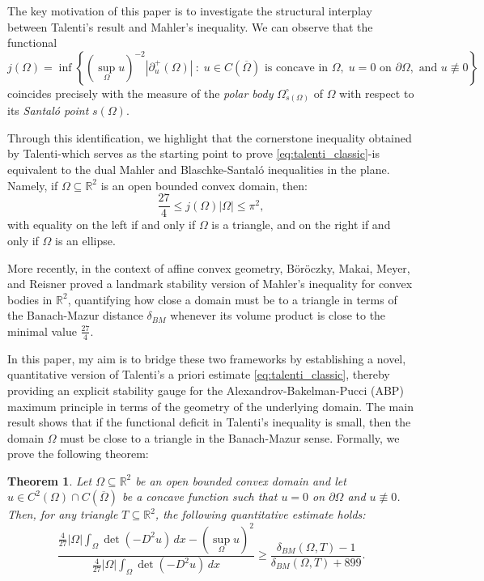 \documentclass[10pt,a4paper]{amsart}
\newtheorem{theorem}{Theorem}[section]
\numberwithin{equation}{section}
\begin{document}
\noindent The key motivation of this paper is to investigate the structural interplay between Talenti's result and Mahler's inequality. We can observe that the functional
\begin{equation}\label{eq:functional_j}
j(\Omega) = \inf \left\{ (\sup_\Omega u)^{-2} |\partial^+_u(\Omega)| \ : \; u \in C(\overline{\Omega}) \text{ is concave in } \Omega, \; u = 0 \text{ on } \partial \Omega, \text{ and } u \not\equiv 0 \right\}
\end{equation}
coincides precisely with the measure of the \textit{polar body} $\Omega^\circ_{s(\Omega)}$ of $\Omega$ with respect to its \textit{Santaló point} $s(\Omega)$. 

\noindent Through this identification, we highlight that the cornerstone inequality obtained by Talenti-which serves as the starting point to prove \eqref{eq:talenti_classic}-is equivalent to the dual Mahler and Blaschke-Santaló inequalities in the plane. Namely, if $\Omega \subseteq \mathbb{R}^2$ is an open bounded convex domain, then:
\begin{equation}
\frac{27}{4} \leq j(\Omega)|\Omega| \leq \pi^2,
\end{equation}
with equality on the left if and only if $\Omega$ is a triangle, and on the right if and only if $\Omega$ is an ellipse.

\noindent More recently, in the context of affine convex geometry, Böröczky, Makai, Meyer, and Reisner \cite{boroczky2013} proved a landmark stability version of Mahler's inequality for convex bodies in $\mathbb{R}^2$, quantifying how close a domain must be to a triangle in terms of the Banach-Mazur distance $\delta_{BM}$ whenever its volume product is close to the minimal value $\frac{27}{4}$.

\noindent In this paper, my aim is to bridge these two frameworks by establishing a novel, quantitative version of Talenti's a priori estimate \eqref{eq:talenti_classic}, thereby providing an explicit stability gauge for the Alexandrov-Bakelman-Pucci (ABP) maximum principle in terms of the geometry of the underlying domain. The main result shows that if the functional deficit in Talenti's inequality is small, then the domain $\Omega$ must be close to a triangle in the Banach-Mazur sense. Formally, we prove the following theorem:

\begin{theorem}
Let $\Omega \subseteq \mathbb{R}^2$ be an open bounded convex domain and let $u \in C^2(\Omega)\cap C(\overline{\Omega})$ be a concave function such that $u=0$ on $\partial \Omega$ and $u \not\equiv 0$. Then, for any triangle $T \subseteq \mathbb{R}^2$, the following quantitative estimate holds:
\begin{equation}\label{eq:main_stability}
\frac{\frac{4}{27}|\Omega|\displaystyle\int_\Omega\det (-D^2u)\,dx - (\sup_\Omega u)^2}{\frac{4}{27}|\Omega|\displaystyle\int_\Omega\det (-D^2u)\,dx} \ge \frac{\delta_{BM}(\Omega, T)-1}{\delta_{BM}(\Omega,T)+899}.
\end{equation}
\end{theorem}
\end{document}
